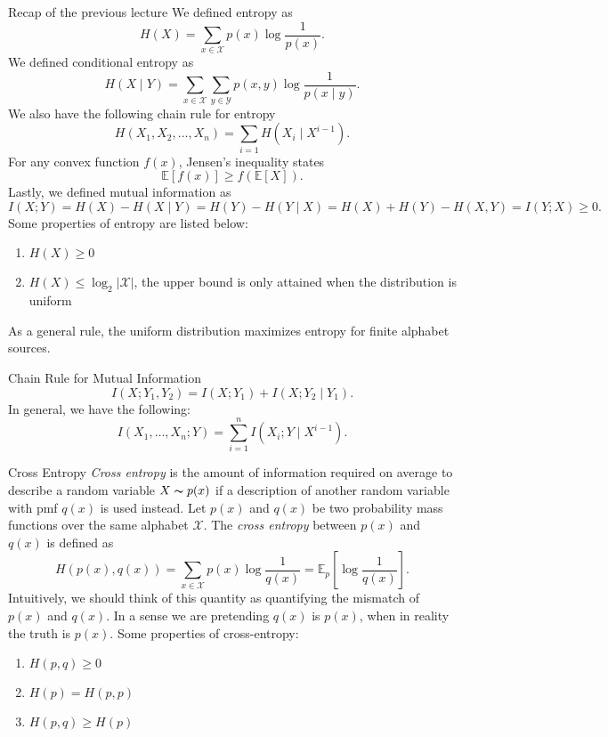 

\begin{misc}{Recap of the previous lecture}{}
We defined entropy as
\[
    H(X) = \sum_{x \in \mathcal{X} } p(x) \log \frac{1}{p(x)}.
\]
We defined conditional entropy as
\[
    H(X\mid Y) = \sum_{x\in \mathcal{X} }\sum_{y\in \mathcal{Y} }  p(x,y) \log \frac{1}{p(x\mid y)} .
\]
We also have the following chain rule for entropy
\[
    H(X_1,X_2, \dots , X_{n}  ) = \sum_{i = 1} H(X_i\mid X^{i- 1} ).
\]
For any convex function \(f(x)\), Jensen's inequality states
\[
    \mathbb{E} \left[ f(x) \right] \geq f(\mathbb{E} \left[ X \right] ). 
\]
Lastly, we defined mutual information as 
\[
    I(X;Y) = H(X)- H(X\mid Y) = H(Y)- H(Y\mid X) = H(X) + H(Y)- H(X,Y)  = I(Y;X) \geq 0.
\]
Some properties of entropy are listed below:
\begin{enumerate}
    \item \(H(X) \geq 0\) 
    \item \(H(X) \leq \log _2 \left\lvert \mathcal{X}  \right\rvert \), the upper bound is only attained when the distribution is uniform
\end{enumerate}
As a general rule, the uniform distribution maximizes entropy for finite alphabet sources. 
\end{misc}

\begin{thrm}{Chain Rule for Mutual Information}{}
\[
    I(X;Y_1,Y_2) = I(X;Y_1) + I(X;Y_2\mid Y_1).
\]
In general, we have the following:
\[
    I(X_1, \dots , X_{n} ;Y) = \sum_{i = 1} ^n I(X_{i} ;Y \mid X^{i - 1}). 
\]
\end{thrm}



\begin{defn}{Cross Entropy}{}
\textit{Cross entropy} is the amount of information required on average to describe a random variable \(X \thicksim p(x)\) if a description of another random variable with pmf \(q(x)\) is used instead.   Let \(p(x) \) and \(q(x)\) be two probability mass functions over the same alphabet \(\mathcal{X} \). The \textit{cross entropy} between \(p(x)\) and \(q(x)\) is defined as 
\[
    H(p(x),q(x)) = \sum_{x\in \mathcal{X} } p(x)\log \frac{1}{q(x)} = \mathbb{E} _{p} \left[ \log \frac{1}{q(x)}  \right]  .
\]
Intuitively, we should think of this quantity as quantifying the mismatch of \(p(x)\) and \(q(x )\). In a sense we are pretending \(q(x)\) is \(p(x)\), when in reality the truth is \(p(x) \).   Some properties of cross-entropy:
\begin{enumerate}
    \item \(H(p,q) \geq 0\) 
    \item \(H(p) = H(p,p)\) 
    \item \(H(p,q)\geq H(p)\) 
\end{enumerate}
\end{defn}
